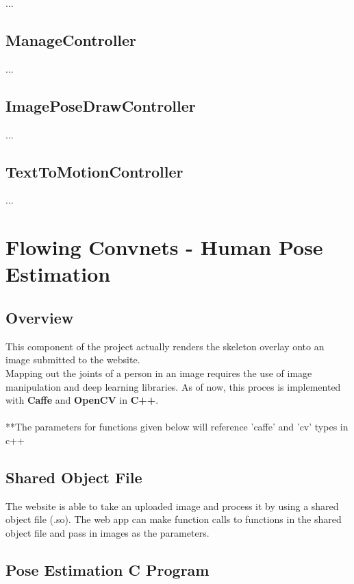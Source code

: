 \documentclass{scrreprt}
\begin{document}
...

\subsection{ManageController}

...

\subsection{ImagePoseDrawController}

...

\subsection{TextToMotionController}

...

\break

\section{Flowing Convnets - Human Pose Estimation}

\subsection{Overview}

This component of the project actually renders the skeleton overlay onto an image submitted to the website.
\\
Mapping out the joints of a person in an image requires the use of image manipulation and deep learning libraries. As of now, this proces is implemented with \textbf{Caffe} and \textbf{OpenCV} in \textbf{C++}.
\\
\\
**The parameters for functions given below will reference 'caffe' and 'cv' types in c++



\subsection{Shared Object File}

The website is able to take an uploaded image and process it by using a shared object file (.so). The web app can make function calls to functions in the shared object file and pass in images as the parameters.


\subsection{Pose Estimation C Program}
\end{document}
